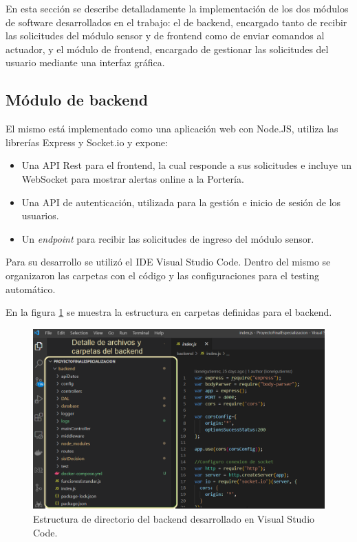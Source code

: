En esta sección se describe detalladamente la implementación de los dos módulos de software desarrollados en el trabajo: el de backend, encargado tanto de recibir las solicitudes del módulo sensor y de frontend como de enviar comandos al actuador, y el módulo de frontend, encargado de gestionar las solicitudes del usuario mediante una interfaz gráfica.

\subsection{Módulo de backend}

El mismo está implementado como una aplicación web con Node.JS, utiliza las librerías Express y Socket.io y expone:

\begin{itemize}
\item Una API Rest para el frontend, la cual responde a sus solicitudes e incluye un WebSocket para mostrar alertas online a la Portería.
\item Una API de autenticación, utilizada para la gestión e inicio de sesión de los usuarios.
\item Un \textit{endpoint} para recibir las solicitudes de ingreso del módulo sensor.
\end{itemize}

Para su desarrollo se utilizó el IDE Visual Studio Code. Dentro del mismo se organizaron las carpetas con el código y las configuraciones para el testing automático.

En la figura \ref{fig:backendCarpetas}  se muestra la estructura en carpetas definidas para el backend.

\begin{figure}[ht]
	\centering
	\includegraphics[width=1\textwidth]{./Figures/backendCarpetas.png}
	\caption{Estructura de directorio del backend desarrollado en Visual Studio Code.}
	\label{fig:backendCarpetas}
\end{figure}

